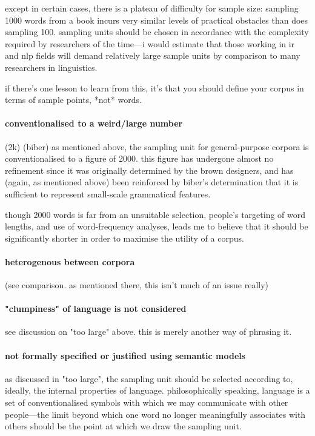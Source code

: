 except in certain cases, there is a plateau of difficulty for sample size: sampling 1000 words from a book incurs very similar levels of practical obstacles than does sampling 100.  sampling units should be chosen in accordance with the complexity required by researchers of the time---i would estimate that those working in ir and nlp fields will demand relatively large sample units by comparison to many researchers in linguistics.

if there's one lesson to learn from this, it's that you should define your corpus in terms of sample points, *not* words.




\paragraph{conventionalised to a weird/large number }
(2k) (biber)
as mentioned above, the sampling unit for general-purpose corpora is conventionalised to a figure of 2000.  this figure has undergone almost no refinement since it was originally determined by the brown designers, and has (again, as mentioned above) been reinforced by biber's determination that it is sufficient to represent small-scale grammatical features.

though 2000 words is far from an unsuitable selection, people's targeting of word lengths, and use of word-frequency analyses, leads me to believe that it should be significantly shorter in order to maximise the utility of a corpus.



\paragraph{heterogenous between corpora }
(see comparison.  as mentioned there, this isn't much of an issue really)



\paragraph{"clumpiness" of language is not considered}
see discussion on "too large" above.  this is merely another way of phrasing it.


\paragraph{not formally specified or justified using semantic models}
as discussed in "too large", the sampling unit should be selected according to, ideally, the internal properties of language.  philosophically speaking, language is a set of conventionalised symbols with which we may communicate with other people---the limit beyond which one word no longer meaningfully associates with others should be the point at which we draw the sampling unit.

